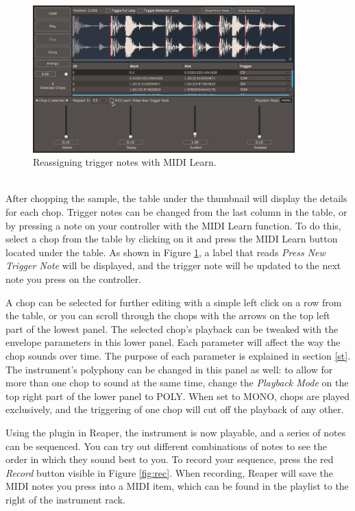 \documentclass[12pt, a4paper, hidelinks]{report}
\begin{document}
	\begin{figure}[h!]
		\centering
		\includegraphics[width=0.9\textwidth]{u/learn.png}
		\caption{Reassigning trigger notes with MIDI Learn.}
		\label{fig:learn}
	\end{figure}    
	
	~\\
	After chopping the sample, the table under the thumbnail will display the details for each chop. Trigger notes can be changed from the last column in the table, or by pressing a note on your controller with the MIDI Learn function. To do this, select a chop from the table by clicking on it and press the MIDI Learn button located under the table. As shown in Figure \ref{fig:learn}, a label that reads \textit{Press New Trigger Note} will be displayed, and the trigger note will be updated to the next note you press on the controller. \par
	
	A chop can be selected for further editing with a simple left click on a row from the table, or you can scroll through the chops with the arrows on the top left part of the lowest panel. The selected chop's playback can be tweaked with the envelope parameters in this lower panel. Each parameter will affect the way the chop sounds over time. The purpose of each parameter is explained in section \ref{st}. The instrument's polyphony can be changed in this panel as well: to allow for more than one chop to sound at the same time, change the \textit{Playback Mode} on the top right part of the lower panel to POLY. When set to MONO, chops are played exclusively, and the triggering of one chop will cut off the playback of any other.
	
	Using the plugin in Reaper, the instrument is now playable, and a series of notes can be sequenced. You can try out different combinations of notes to see the order in which they sound best to you. To record your sequence, press the red \textit{Record} button visible in Figure \ref{fig:rec}. When recording, Reaper will save the MIDI notes you press into a MIDI item, which can be found in the playlist to the right of the instrument rack. \par
	
\end{document}
